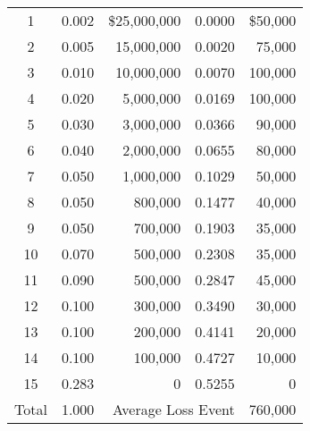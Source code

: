 \documentclass[]{article}
\begin{document}
\begin{itemize}
\begin{table}[h]
\begin{tabular}{crrrr}
    \midrule
    1     & 0.002 &         \$25,000,000  & 0.0000 &            \$50,000  \\
    2     & 0.005 &          15,000,000  & 0.0020 &            75,000  \\
    3     & 0.010 &          10,000,000  & 0.0070 &          100,000  \\
    4     & 0.020 &            5,000,000  & 0.0169 &          100,000  \\
    5     & 0.030 &            3,000,000  & 0.0366 &            90,000  \\
    6     & 0.040 &            2,000,000  & 0.0655 &            80,000  \\
    7     & 0.050 &            1,000,000  & 0.1029 &            50,000  \\
    8     & 0.050 &                800,000  & 0.1477 &            40,000  \\
    9     & 0.050 &                700,000  & 0.1903 &            35,000  \\
    10    & 0.070 &                500,000  & 0.2308 &            35,000  \\
    11    & 0.090 &                500,000  & 0.2847 &            45,000  \\
    12    & 0.100 &                300,000  & 0.3490 &            30,000  \\
    13    & 0.100 &                200,000  & 0.4141 &            20,000  \\
    14    & 0.100 &                100,000  & 0.4727 &            10,000  \\
    15    & 0.283 &                            0    & 0.5255 &                     0    \\
     \midrule
    Total & 1.000 & \multicolumn{2}{r}{Average Loss Event} &          760,000  \\
    \bottomrule
    \end{tabular}%
  \label{tab:addlabel}%
\end{table}%


\end{itemize}
\end{document}
